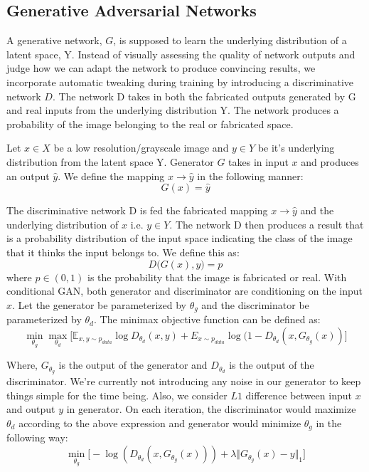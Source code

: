 \documentclass[oneside,a4paper,12pt]{report}
\begin{document}
\subsection{Generative Adversarial Networks}
\hspace*{0.25 in}A generative network, $G$, is supposed to learn the underlying distribution of a latent space, Y. Instead of visually assessing the quality of network outputs and judge how we can adapt the network to produce convincing results, we incorporate automatic tweaking during training by introducing a discriminative network $D$. The network D takes in both the fabricated outputs generated by G and real inputs from the underlying distribution Y. The network produces a probability of the image belonging to the real or fabricated space.

  Let $x \in X$ be a low resolution/grayscale image and $y \in Y$ be it's underlying distribution from the latent space Y. Generator $G$ takes in input $x$ and produces an output $\hat{y}$. We define the mapping $x \rightarrow \hat{y}$ in the following manner:
  $$G(x) = \hat{y}$$

 The discriminative network D is fed the fabricated mapping $x \rightarrow \hat{y}$ and the underlying distribution of $x$ i.e. $y \in Y$. The network D then produces a result that is a probability distribution of the input space indicating the class of the image that it thinks the input belongs to. We define this as:
 $$D\big(G(x),y\big) = p$$
 where $p \in (0,1)$ is the probability that the image is fabricated or real.
With conditional GAN, both generator and discriminator are conditioning on the input $x$. Let the generator be parameterized by $\theta_g$ and the discriminator be parameterized by $\theta_d$. The minimax objective function can be defined as:
	\[
		\min_{\theta_g}\max_{\theta_d}\Big[\mathbb{E}_{x,y\sim p_{data}} \log D_{\theta_d}(x,y) + E_{x\sim p_{data}} \log(1 - D_{\theta_d}(x, G_{\theta_g}(x))\Big]
	\]

	Where, $G_{\theta_{g}}$ is the output of the generator and $D_{\theta_d}$ is the output of the discriminator.
	We're currently not introducing any noise in our generator to keep things simple for the time being. Also, we consider $L1$ difference between input $x$ and output $y$ in generator. On each iteration, the discriminator would maximize $\theta_d$ according to the above expression and generator would minimize $\theta_g$ in the following way:
	\[
		\min_{\theta_g}\Big[-\log(D_{\theta_d}(x,G_{\theta_g}(x)))+\lambda \Vert G_{\theta_g}(x) - y \Vert_1 \Big]
	\]
	
\end{document}
